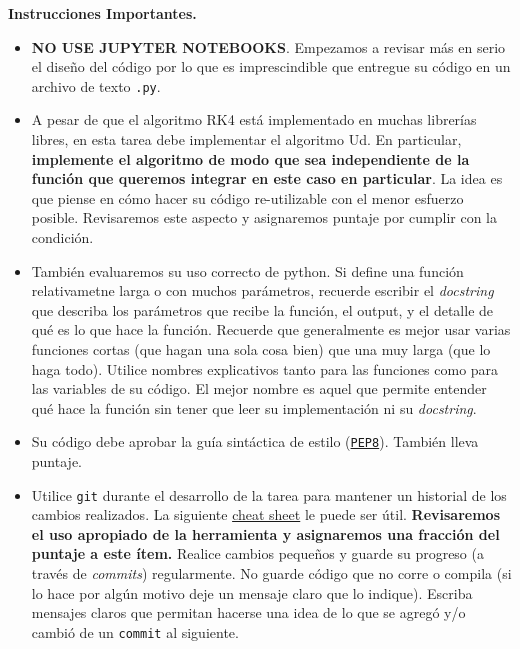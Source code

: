 \documentclass[letter, 11pt]{article}
\begin{document}
\vspace{1.5em}
\noindent\textbf{Instrucciones Importantes.}
\begin{itemize}

\item \textbf{NO USE JUPYTER NOTEBOOKS}. Empezamos a revisar más en serio el
  diseño del código por lo que es imprescindible que entregue su código en un
  archivo de texto \texttt{.py}.

\item A pesar de que el algoritmo RK4 está implementado en muchas librerías
  libres, en esta tarea debe implementar el algoritmo Ud. En particular,
  \textbf{implemente el algoritmo de modo que sea independiente de la función
  que queremos integrar en este caso en particular}. La idea es que piense en
  cómo hacer su código re-utilizable con el menor esfuerzo posible. Revisaremos
  este aspecto y asignaremos puntaje por cumplir con la condición.

\item También evaluaremos su uso correcto de python. Si define una función
  relativametne larga o con muchos parámetros, recuerde escribir el
  \emph{docstring} que describa los parámetros que recibe la función, el
  output, y el detalle de qué es lo que hace la función. Recuerde que
  generalmente es mejor usar varias funciones cortas (que hagan una sola cosa
  bien) que una muy larga (que lo haga todo).  Utilice nombres explicativos
  tanto para las funciones como para las variables de su código. El mejor
  nombre es aquel que permite entender qué hace la función sin tener que leer
  su implementación ni su \emph{docstring}.

\item Su código debe aprobar la guía sintáctica de estilo
  (\href{https://www.python.org/dev/peps/pep-0008/}{\texttt{PEP8}}). También
  lleva puntaje.

\item Utilice \texttt{git} durante el desarrollo de la tarea para mantener un
  historial de los cambios realizados. La siguiente
  \href{https://education.github.com/git-cheat-sheet-education.pdf}{cheat
    sheet} le puede ser útil. {\bf Revisaremos el uso apropiado de la
  herramienta y asignaremos una fracción del puntaje a este ítem.} Realice
  cambios pequeños y guarde su progreso (a través de \emph{commits})
  regularmente. No guarde código que no corre o compila (si lo hace por algún
  motivo deje un mensaje claro que lo indique). Escriba mensajes claros que
  permitan hacerse una idea de lo que se agregó y/o cambió de un
  \texttt{commit} al siguiente.


\end{itemize}
\end{document}
